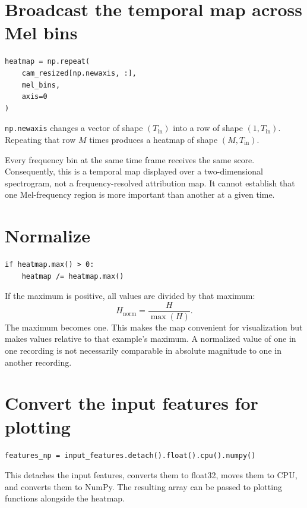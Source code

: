 \documentclass[11pt,a4paper]{article}
\begin{document}
\section{Broadcast the temporal map across Mel bins}
\begin{lstlisting}[style=python]
heatmap = np.repeat(
    cam_resized[np.newaxis, :],
    mel_bins,
    axis=0
)
\end{lstlisting}
\texttt{np.newaxis} changes a vector of shape $(T_{\mathrm{in}})$ into a row of shape $(1,T_{\mathrm{in}})$. Repeating that row $M$ times produces a heatmap of shape $(M,T_{\mathrm{in}})$.

Every frequency bin at the same time frame receives the same score. Consequently, this is a temporal map displayed over a two-dimensional spectrogram, not a frequency-resolved attribution map. It cannot establish that one Mel-frequency region is more important than another at a given time.

\section{Normalize}
\begin{lstlisting}[style=python]
if heatmap.max() > 0:
    heatmap /= heatmap.max()
\end{lstlisting}
If the maximum is positive, all values are divided by that maximum:
\[
H_{\mathrm{norm}}=\frac{H}{\max(H)}.
\]
The maximum becomes one. This makes the map convenient for visualization but makes values relative to that example's maximum. A normalized value of one in one recording is not necessarily comparable in absolute magnitude to one in another recording.

\section{Convert the input features for plotting}
\begin{lstlisting}[style=python]
features_np = input_features.detach().float().cpu().numpy()
\end{lstlisting}
This detaches the input features, converts them to float32, moves them to CPU, and converts them to NumPy. The resulting array can be passed to plotting functions alongside the heatmap.
\end{document}
